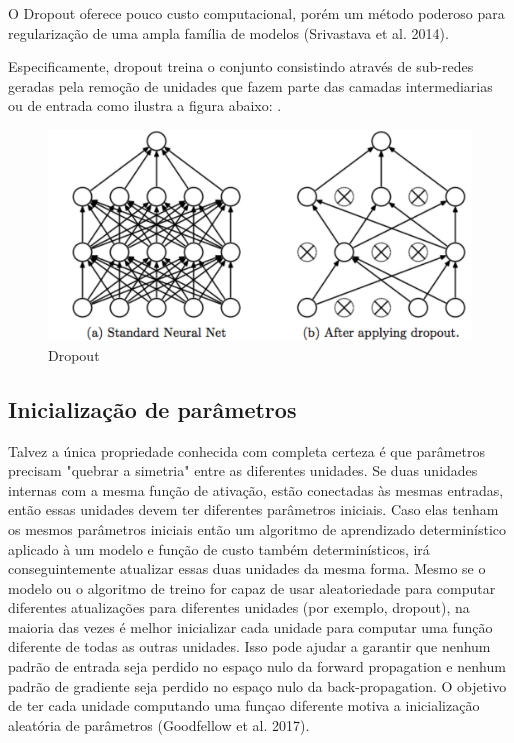 \documentclass[12pt]{article}
\begin{document}
O Dropout oferece pouco custo computacional, porém um método poderoso para regularização de uma ampla família de modelos (Srivastava et al. 2014).

Especificamente, dropout treina o conjunto consistindo através de sub-redes geradas pela remoção de unidades que fazem parte das camadas intermediarias ou de entrada como ilustra a figura abaixo: \cite{Goodfellow-et-al-2016}.

\begin{figure}[ht]
\centering
\includegraphics[width=.8\textwidth]{images/dropout.png}
\caption{Dropout}
\label{fig:dropout}
\end{figure}

\subsection{Inicialização de parâmetros}

Talvez a única propriedade conhecida com completa certeza é que parâmetros precisam "quebrar a simetria" entre as diferentes unidades. Se duas unidades internas com a mesma função de ativação, estão conectadas às mesmas entradas, então essas unidades devem ter diferentes parâmetros iniciais. Caso elas tenham os mesmos parâmetros iniciais então um algoritmo de aprendizado determinístico aplicado à um modelo e função de custo também determinísticos, irá conseguintemente atualizar essas duas unidades da mesma forma. Mesmo se o modelo ou o algoritmo de treino for capaz de usar aleatoriedade para computar diferentes atualizações para diferentes unidades (por exemplo, dropout), na maioria das vezes é melhor inicializar cada unidade para computar uma função diferente de todas as outras unidades. Isso pode ajudar a garantir que nenhum padrão de entrada seja perdido no espaço nulo da forward propagation e nenhum padrão de gradiente seja perdido no espaço nulo da back-propagation. O objetivo de ter cada unidade computando uma funçao diferente motiva a inicialização aleatória de parâmetros (Goodfellow et al. 2017).
\end{document}
